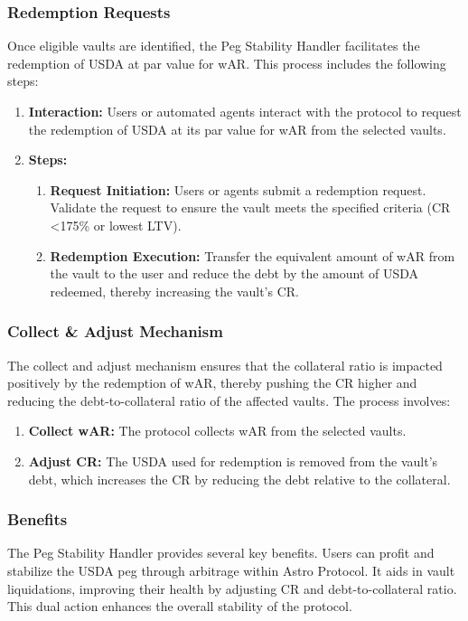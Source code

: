 \subsubsection{Redemption Requests}
Once eligible vaults are identified, the Peg Stability Handler facilitates the redemption of USDA at par value for wAR. This process includes the following steps:

\begin{enumerate}
    \item \textbf{Interaction:} Users or automated agents interact with the protocol to request the redemption of USDA at its par value for wAR from the selected vaults.

    \item \textbf{Steps:}
    \begin{enumerate}
        \item \textbf{Request Initiation:} Users or agents submit a redemption request. Validate the request to ensure the vault meets the specified criteria (CR \textless  175\% or lowest LTV).
        \item \textbf{Redemption Execution:} Transfer the equivalent amount of wAR from the vault to the user and reduce the debt by the amount of USDA redeemed, thereby increasing the vault’s CR.
    \end{enumerate}
\end{enumerate}

\subsubsection{Collect \& Adjust Mechanism}
The collect and adjust mechanism ensures that the collateral ratio is impacted positively by the redemption of wAR, thereby pushing the CR higher and reducing the debt-to-collateral ratio of the affected vaults. The process involves:

\begin{enumerate}
    \item \textbf{Collect wAR:} The protocol collects wAR from the selected vaults.
    \item \textbf{Adjust CR:} The USDA used for redemption is removed from the vault's debt, which increases the CR by reducing the debt relative to the collateral.
\end{enumerate}

\subsubsection{Benefits}
The Peg Stability Handler provides several key benefits. Users can profit and stabilize the USDA peg through arbitrage within Astro Protocol. It aids in vault liquidations, improving their health by adjusting CR and debt-to-collateral ratio. This dual action enhances the overall stability of the protocol.

